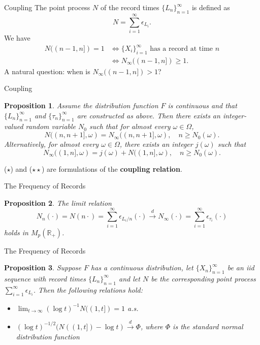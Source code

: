 \documentclass{beamer}
\newtheorem{proposition}{Proposition}
\begin{document}
\begin{frame}{Coupling}
    The point process $N$ of the record times $\{L_n\}_{n = 1}^{\infty}$ is defined as
    \[
    N = \sum_{i = 1}^{\infty} \epsilon_{L_i}.
    \]
    We have
    \begin{align*}
        N((n - 1, n]) = 1 &\iff \text{$\{X_i\}_{i = 1}^{\infty}$ has a record at time $n$} \\
        &\iff N_{\infty}((n - 1, n]) \ge 1.
    \end{align*}
    A natural question: when is $N_{\infty}((n - 1, n]) > 1$?
\end{frame}

\begin{frame}{Coupling}
    \begin{proposition}
        Assume the distribution function $F$ is continuous and that $\{L_n\}_{n = 1}^{\infty}$ and $\{\tau_n\}_{n = 1}^{\infty}$ are constructed as above. Then there exists an integer-valued random variable $N_0$ such that for almost every $\omega \in \Omega$,
        \[
        N((n, n + 1], \omega) = N_{\infty}((n, n + 1], \omega), \quad n \ge N_0(\omega). \tag{$\star$}
        \]
        Alternatively, for almost every $\omega \in \Omega$, there exists an integer $j(\omega)$ such that
        \[
        N_{\infty}((1, n], \omega) = j(\omega) + N((1, n], \omega), \quad n \ge N_0(\omega). \tag{$\star\star$}
        \]
    \end{proposition}
    ($\star$) and ($\star\star$) are formulations of the \textbf{coupling relation}.
\end{frame}

\begin{frame}{The Frequency of Records}
    \begin{proposition}
        The limit relation
        \[
        N_n(\cdot) = N(n\cdot) = \sum_{i = 1}^{\infty} \epsilon_{L_i / n}(\cdot) \xrightarrow{d} N_{\infty}(\cdot) = \sum_{i = 1}^{\infty} \epsilon_{\tau_i}(\cdot)
        \]
        holds in $M_p(\mathbb{R}_+)$.
    \end{proposition}
\end{frame}

\begin{frame}{The Frequency of Records}
    \begin{proposition}
        Suppose $F$ has a continuous distribution, let $\{X_n\}_{n = 1}^{\infty}$ be an iid sequence with record times $\{L_n\}_{n = 1}^{\infty}$ and let $N$ be the corresponding point process $\sum_{i = 1}^{\infty} \epsilon_{L_i}$. Then the following relations hold:
        \begin{itemize}
            \item $\lim_{t \to \infty} (\log t)^{-1}N((1, t]) = 1$ a.s.
            \item $(\log t)^{-1 / 2}(N((1, t]) - \log t) \xrightarrow{d} \Phi$, where $\Phi$ is the standard normal distribution function
        \end{itemize}
    \end{proposition}
\end{frame}
\end{document}
